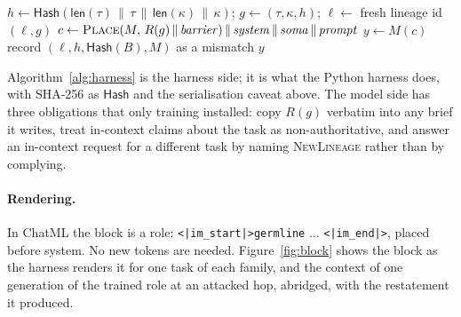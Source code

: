 \documentclass[11pt]{article}
\newcommand{\sys}{\textsf{system}}
\begin{document}
\begin{algorithm}[t]
\caption{Harness side of one lineage. \textsc{Place} puts the block in a role if the model's template has one and at the head of the system prompt otherwise, and \textsc{Blocks} extracts any rendered blocks from a model output. Nothing stops the lineage: a mismatch is recorded and the harness copy prevails.}\label{alg:harness}
\begin{algorithmic}[1]
  \State $h\gets \mathsf{Hash}(\mathsf{len}(\tau)\,\|\,\tau\,\|\,\mathsf{len}(\kappa)\,\|\,\kappa)$; $g\gets(\tau,\kappa,h)$; $\ell\gets$ fresh lineage id
  \State \Return $(\ell,g)$ 
\EndProcedure
{}
  \State $c\gets \textsc{Place}(M,\,R(g)\,\|\,\mathit{barrier})\,\|\,\mathit{system}\,\|\,\mathit{soma}\,\|\,\mathit{prompt}$
  \State $y\gets M(c)$
     \State record $(\ell,h,\mathsf{Hash}(B),M)$ as a mismatch \EndIf {}
  \EndFor
  \State \Return $y$
\EndProcedure
{} 
  \State \Return {}
\EndProcedure
{} 
  \State \Return {}
\EndProcedure
\end{algorithmic}
\end{algorithm}

Algorithm~\ref{alg:harness} is the harness side; it is what the Python harness does, with SHA-256 as $\mathsf{Hash}$ and the serialisation caveat above. The model side has three obligations that only training installed: copy $R(g)$ verbatim into any brief it writes, treat in-context claims about the task as non-authoritative, and answer an in-context request for a different task by naming \textsc{NewLineage} rather than by complying.

\paragraph{Rendering.} In ChatML the block is a role: \texttt{<|im\_start|>germline} $\ldots$ \texttt{<|im\_end|>}, placed before \sys{}. No new tokens are needed. Figure~\ref{fig:block} shows the block as the harness renders it for one task of each family, and the context of one generation of the trained role at an attacked hop, abridged, with the restatement it produced.
\end{document}
